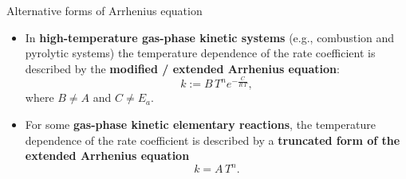 \begin{frame}{Alternative forms of Arrhenius equation}
	\begin{itemize}
		\item In {\bf high-temperature gas-phase kinetic systems} (e.g., combustion and pyrolytic
		systems) the temperature dependence of the rate coefficient is described by the 
		\alert{\bf modified / extended Arrhenius equation}:
		\[
		k := B\,T^n e^{-\tfrac{C}{R\, T}},
		\]
		where $B \neq A$ and $C \neq E_a$.
		\item For some {\bf gas-phase kinetic elementary reactions}, the temperature dependence of 
		the rate coefficient is described by a 	\alert{\bf truncated form of the extended Arrhenius equation}
		\[
		k= A\,T^n.
		\]
	\end{itemize}

\end{frame}
%
%
